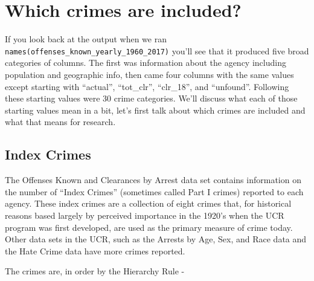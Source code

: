 \documentclass[
  12pt,
]{book}
\begin{document}
\hypertarget{which-crimes-are-included}{%
\section{Which crimes are included?}\label{which-crimes-are-included}}

If you look back at the output when we ran \texttt{names(offenses\_known\_yearly\_1960\_2017)} you'll see that it produced five broad categories of columns. The first was information about the agency including population and geographic info, then came four columns with the same values except starting with ``actual'', ``tot\_clr'', ``clr\_18'', and ``unfound''. Following these starting values were 30 crime categories. We'll discuss what each of those starting values mean in a bit, let's first talk about which crimes are included and what that means for research.

\hypertarget{index-crimes}{%
\subsection{Index Crimes}\label{index-crimes}}

The Offenses Known and Clearances by Arrest data set contains information on the number of ``Index Crimes'' (sometimes called Part I crimes) reported to each agency. These index crimes are a collection of eight crimes that, for historical reasons based largely by perceived importance in the 1920's when the UCR program was first developed, are used as the primary measure of crime today. Other data sets in the UCR, such as the Arrests by Age, Sex, and Race data and the Hate Crime data have more crimes reported.

The crimes are, in order by the Hierarchy Rule -
\end{document}

